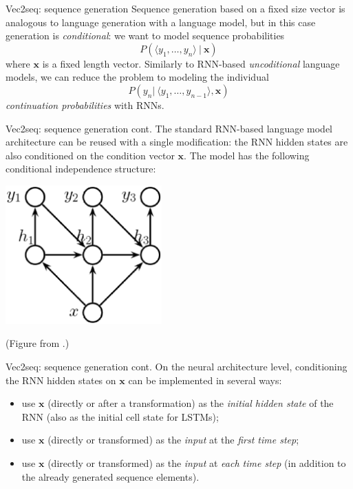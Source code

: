 \documentclass[style=upen, size=14pt]{powerdot}
\theoremstyle{definition}
\begin{document}
\begin{slide}[toc=Sequence generation]{Vec2seq: sequence generation}
  Sequence generation based on a fixed size vector is analogous to language
  generation with a language model, but in this case generation is
  \emph{conditional}: we want to model sequence probabilities
  $$
  P(\langle y_1,\dots, y_n\rangle ~|~ \mathbf{x}) 
  $$
  where $\mathbf{x}$ is a fixed length vector. Similarly to RNN-based
  \emph{uncoditional} language models, we can reduce the problem to modeling the
  individual
  $$
  P( y_n|~ \langle y_1,\dots,y_{n-1} \rangle, \mathbf{x})
  $$
  \emph{continuation probabilities} with RNNs.
\end{slide}

\begin{slide}[toc=]{Vec2seq: sequence generation cont.}
  The standard RNN-based language model architecture can be reused with a single
  modification: the RNN hidden states are also conditioned on the condition
  vector $\mathbf{x}$. The model has the following conditional independence
  structure:
  \begin{center}
    \includegraphics[width=0.45\textwidth]{figures/vec2seq_graph_mod.eps}
    
    \footnotesize{(Figure from \cite{murphy2021pml}.)}
  \end{center}
\end{slide}

\begin{slide}[toc=]{Vec2seq: sequence generation cont.}
  On the neural architecture level, conditioning the RNN hidden states on 
  $\mathbf{x}$ can be implemented in several ways:
  \begin{itemize}
  \item use $\mathbf{x}$ (directly or after a transformation) as the
    \emph{initial hidden state} of the RNN (also as the initial cell state for
    LSTMs);
  \item use $\mathbf{x}$ (directly or transformed) as the \emph{input} at the
    \emph{first time step};
  \item use $\mathbf{x}$ (directly or transformed) as the \emph{input} at
    \emph{each time step} (in addition to the already generated sequence
    elements).
  \end{itemize}
\end{slide}
\end{document}
